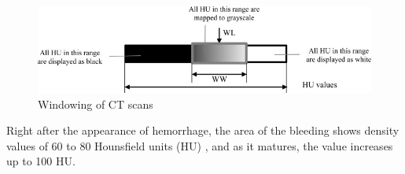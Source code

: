 \begin{figure}[h]
\begin{centering}
\includegraphics[width=15cm]{assets/images/windowingHU}
\par\end{centering}
\caption{Windowing of CT scans
\label{fig:windowing}}
\end{figure}

Right after the appearance of hemorrhage, the area of the bleeding shows density values of 60 to 80 Hounsfield units (HU) \cite{principlesOfCT}, and as it matures, the value increases up to 100 HU. 
